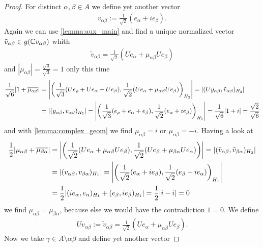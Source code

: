 \begin{proof}
	For distinct $\alpha, \beta \in A$ we define yet another vector
	\begin{align*}
		v_{\alpha \beta} := \frac{1}{\sqrt{2}}(e_\alpha + ie_\beta).
	\end{align*}
	Again we can use \ref{lemma:aux_main} and find a unique normalized vector $\tilde{v}_{\alpha \beta} \in g(\mathbb{C} v_{\alpha \beta})$ whith
	\begin{align*}
		\tilde{v}_{\alpha \beta} = \frac{1}{\sqrt{2}}(Ue_\alpha + \mu_{\alpha \beta} Ue_\beta)
	\end{align*}
	and $|\mu_{\alpha \beta}| = \frac{\sqrt{3}}{\sqrt{3}} = 1$ only this time
	\begin{align*}
		\frac{1}{\sqrt{6}} {\left | 1 + \overline{\mu_{\alpha \beta}} \right |} &= {\left | {\left ( \frac{1}{\sqrt{3}} {\left ( Ue_\rho + Ue_\alpha + Ue_\beta \right )}, \frac{1}{\sqrt{2}} {\left ( Ue_\alpha + \mu_{\alpha \beta}Ue_\beta \right )} \right )}_{H_2} \right |} = |(Uy_{\alpha \beta}, \tilde{v}_{\alpha \beta})_{H_2}| \\
		&= |(y_{\alpha \beta}, v_{\alpha \beta})_{H_1}| = {\left | {\left ( \frac{1}{\sqrt{3}} {\left ( e_\rho + e_\alpha + e_\beta \right )}, \frac{1}{\sqrt{2}} (e_\alpha + ie_\beta) \right )}_{H_1} \right |} = \frac{1}{\sqrt{6}}{\left | 1 + i \right |} = \frac{\sqrt{2}}{\sqrt{6}}
	\end{align*}
	and with \ref{lemma:complex_geom} we find $\mu_{\alpha \beta} = i$ or $\mu_{\alpha \beta} = -i$. Having a look at
	\begin{align*}
		\frac{1}{2}{\left | \mu_{\alpha \beta} + \overline{\mu_{\beta \alpha}} \right |} &= {\left | {\left ( \frac{1}{\sqrt{2}}(Ue_\alpha + \mu_{\alpha \beta} Ue_\beta), \frac{1}{\sqrt{2}}(Ue_\beta + \mu_{\beta \alpha} Ue_\alpha) \right )} \right |} = |(\tilde{v}_{\alpha \beta}, \tilde{v}_{\beta \alpha})_{H_2}| \\
		&= |(v_{\alpha \beta}, v_{\beta \alpha})_{H_1}| = {\left | {\left ( \frac{1}{\sqrt{2}}(e_\alpha + ie_\beta), \frac{1}{\sqrt{2}}(e_\beta + ie_\alpha) \right )}_{H_1} \right |} \\
		&= \frac{1}{2} {\left |  (ie_\alpha, e_\alpha)_{H_1} + (e_\beta, ie_\beta)_{H_1} \right |} = \frac{1}{2} {\left | i - i \right |} = 0
	\end{align*}
	we find $\mu_{\alpha \beta} = \mu_{\beta \alpha}$, because else we would have the contradiction $1 = 0$. We define
	\begin{align*}
		Uv_{\alpha \beta} := \tilde{v}_{\alpha \beta} = \frac{1}{\sqrt{2}}(Ue_\alpha + \mu_{\alpha \beta} Ue_\beta).
	\end{align*}
	Now we take $\gamma \in A \setminus{\alpha \beta}$ and define yet another vector

\end{proof}
